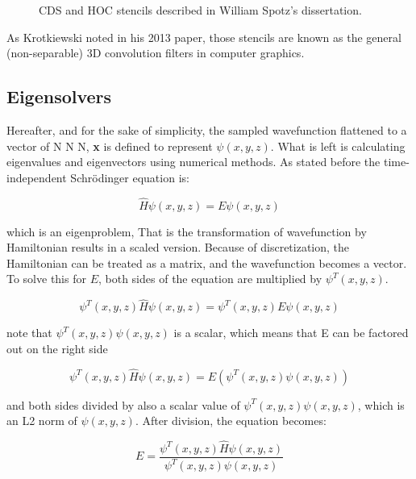 \begin{figure}[t]
	\caption{CDS and HOC stencils described in William Spotz's dissertation. \cite{spotz1996hoc}}
	\label{fig:stencils}
\end{figure}


As Krotkiewski noted in his 2013 paper, those stencils are known as the general (non-separable) 3D convolution filters in computer graphics.\cite{krotkiewski2013efficient} 




\subsection{Eigensolvers}
Hereafter, and for the sake of simplicity, the sampled wavefunction flattened to a vector of N \times N \times N, \textbf{x} is defined to represent $\psi(x,y,z)$. What is left is calculating eigenvalues and eigenvectors using numerical methods. As stated before the time-independent Schr{\"o}dinger equation is:

\begin{equation}
	\hat{H} \psi(x,y,z) = E \psi(x,y,z)
\end{equation}

\noindent which is an eigenproblem,
That is the transformation of wavefunction by Hamiltonian results in a scaled version. Because of discretization, the Hamiltonian can be treated as a matrix, and the wavefunction becomes a vector. To solve this for $E$, both sides of the equation are multiplied by $\psi^T(x,y,z).$

\begin{equation}
	\psi^T(x,y,z) \hat{H} \psi(x,y,z) = \psi^T(x,y,z) E \psi(x,y,z)
\end{equation}

\noindent note that $\psi^T(x,y,z)\psi(x,y,z)$ is a scalar, which means that E can be factored out on the right side

\begin{equation}
	\psi^T(x,y,z) \hat{H} \psi(x,y,z) = E(\psi^T(x,y,z) \psi(x,y,z))
\end{equation}

\noindent and both sides divided by also a scalar value of $\psi^T(x,y,z) \psi(x,y,z)$, which is an L2 norm of $\psi(x,y,z)$. After division, the equation becomes:

\begin{equation}
	E = \frac{\psi^T(x,y,z) \hat{H} \psi(x,y,z)}{\psi^T(x,y,z) \psi(x,y,z)}
\end{equation}

